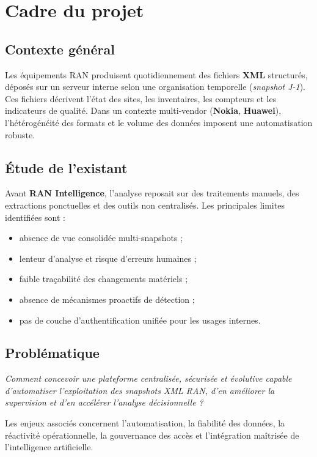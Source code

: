 \documentclass[12pt,a4paper]{report}
\begin{document}
\section{Cadre du projet}\label{sec:ch1-cadre}

\subsection{Contexte général}\label{sec:ch1-contexte}
Les équipements RAN produisent quotidiennement des fichiers \textbf{XML} structurés, déposés sur un serveur interne selon une organisation temporelle (\textit{snapshot J-1}). Ces fichiers décrivent l'état des sites, les inventaires, les compteurs et les indicateurs de qualité. Dans un contexte multi-vendor (\textbf{Nokia}, \textbf{Huawei}), l'hétérogénéité des formats et le volume des données imposent une automatisation robuste.

\subsection{Étude de l'existant}\label{sec:ch1-existant}
Avant \textbf{RAN Intelligence}, l'analyse reposait sur des traitements manuels, des extractions ponctuelles et des outils non centralisés. Les principales limites identifiées sont :
\begin{itemize}[leftmargin=*,itemsep=2pt]
    \item absence de vue consolidée multi-snapshots ;
    \item lenteur d'analyse et risque d'erreurs humaines ;
    \item faible traçabilité des changements matériels ;
    \item absence de mécanismes proactifs de détection ;
    \item pas de couche d'authentification unifiée pour les usages internes.
\end{itemize}

\subsection{Problématique}\label{sec:ch1-problematique}
\begin{center}
\textit{Comment concevoir une plateforme centralisée, sécurisée et évolutive capable d'automatiser l'exploitation des snapshots XML RAN, d'en améliorer la supervision et d'en accélérer l'analyse décisionnelle ?}
\end{center}
Les enjeux associés concernent l'automatisation, la fiabilité des données, la réactivité opérationnelle, la gouvernance des accès et l'intégration maîtrisée de l'intelligence artificielle.
\end{document}
